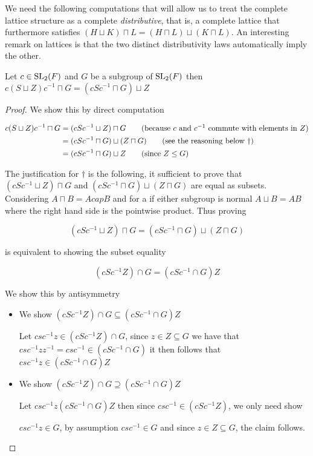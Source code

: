 We need the following computations that will allow us to treat the complete lattice structure as a complete \textit{distributive}, that is, a complete lattice that
furthermore satisfies $(H \sqcup K) \sqcap L = (H \sqcap L) \sqcup (K \sqcap L)$. An interesting remark
on lattices is that the two distinct distributivity laws automatically imply the other.


\begin{lemma}
  \label{MaximalAbelianSubgroup.conj_S_join_Z_meet_G_eq_conj_S_meet_G_join_Z}
  \leanok
  Let $c \in \operatorname{SL}_2(F)$  and $G$ be a subgroup of $\operatorname{SL}_2(F)$ then $c(S \sqcup Z)c^{-1} \sqcap G = (cSc^{-1} \sqcap G) \sqcup Z$
\end{lemma}
\begin{proof}
  \leanok
We show this by direct computation

\begin{align*}
  c(S \sqcup Z)c^{-1} \sqcap G &= (cSc^{-1} \sqcup Z) \sqcap G \tag{because $c$ and $c^{-1}$ commute with elements in $Z$}\\
   &= (cSc^{-1} \sqcap G) \sqcup (Z \sqcap G) \tag{see the reasoning below $\dagger$}\\
   &= (cSc^{-1} \sqcap G) \sqcup Z \tag{since $Z \le G$}
\end{align*}

The justification for $\dagger$ is the following, it sufficient to prove that $(cSc^{-1} \sqcup Z) \sqcap G$
and $(cSc^{-1} \sqcap G) \sqcup (Z \sqcap G)$ are equal as subsets. Considering $A \sqcap B = A cap B$ and for a if either subgroup is normal
$A \sqcup B = AB$ where the right hand side is the pointwise product. Thus proving

\[
  (cSc^{-1} \sqcup Z) \sqcap G = (cSc^{-1} \sqcap G) \sqcup (Z \sqcap G)
\]

is equivalent to showing the subset equality 

\[
(cSc^{-1}Z) \cap G = (cSc^{-1} \cap G)Z
\]

We show this by antisymmetry

\begin{itemize}
  \item We show $(cSc^{-1}Z) \cap G \subseteq (cSc^{-1} \cap G)Z$
  
  Let $csc^{-1}z \in (cSc^{-1}Z) \cap G$, since $z \in Z \subseteq G$ we have that $csc^{-1}zz^{-1} = csc^{-1} \in (cSc^{-1} \cap G)$
  it then follows that $csc^{-1}z \in (cSc^{-1} \cap G)Z$

  
  \item We show $(cSc^{-1}Z) \cap G \supseteq (cSc^{-1} \cap G)Z$
  
  Let $csc^{-1}z (cSc^{-1} \cap G)Z$ then since $csc^{-1} \in (cSc^{-1}Z)$, we only need show

  $csc^{-1}z \in G$, by assumption $csc^{-1} \in G$ and since $z \in Z\subseteq G$, the claim follows.  
\end{itemize}
\end{proof}

